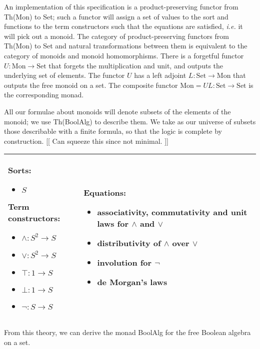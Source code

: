 \documentclass{llncs}
\newcommand{\maps}{\colon}
\newcommand{\Set}{\mathrm{Set}}
\newcommand{\Mon}{\mathrm{Mon}}
\begin{document}
An implementation of this specification is a product-preserving functor from Th(Mon) to Set; such a functor will assign a set of values to the sort and functions to the term constructors such that the equations are satisfied, {\em i.e.} it will pick out a monoid.  The category of product-preserving functors from Th(Mon) to Set and natural transformations between them is equivalent to the category of monoids and monoid homomorphisms.  There is a forgetful functor $U\maps \Mon \to \Set$ that forgets the multiplication and unit, and outputs the underlying set of elements.  The functor $U$ has a left adjoint $L\maps \Set \to \Mon$ that outputs the free monoid on a set.  The composite functor $\Mon = UL\maps \Set \to \Set$ is the corresponding monad.

All our formulae about monoids will denote subsets of the elements of the monoid; we use Th(BoolAlg) to describe them.  We take as our universe of subsets those describable with a finite formula, so that the logic is complete by construction. [[ Can squeeze this since not minimal. ]]
\begin{center}
  \begin{tabular}{|p{0.3\linewidth}|p{0.7\linewidth}|}
    \hline
    Sorts:
    \begin{itemize}
      \item $S$
    \end{itemize}
    Term constructors:
    \begin{itemize}
      \item $\land\maps S^2 \to S$
      \item $\lor\maps S^2 \to S$
      \item $\top\maps 1 \to S$
      \item $\bot\maps 1 \to S$
      \item $\neg\maps S \to S$
    \end{itemize}
    &
    Equations:
    \begin{itemize}
      \item \raggedright associativity, commutativity and unit laws for $\land$ and $\lor$
      \item distributivity of $\land$ over $\lor$
      \item involution for $\neg$
      \item de Morgan's laws
    \end{itemize}\\
    \hline
  \end{tabular}
\end{center}
From this theory, we can derive the monad BoolAlg for the free Boolean algebra on a set.
\end{document}
